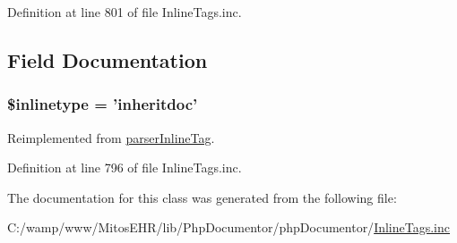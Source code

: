\-Definition at line 801 of file \-Inline\-Tags.\-inc.


\begin{DoxyCode}
    {
    }
\end{DoxyCode}


\subsection{\-Field \-Documentation}
\hypertarget{classparser_inheritdoc_inline_tag_a7583c1b3912b7afa3f038eb353a6ad97}{
\subsubsection[{\$inlinetype}]{\setlength{\rightskip}{0pt plus 5cm}\$inlinetype = 'inheritdoc'}}\label{classparser_inheritdoc_inline_tag_a7583c1b3912b7afa3f038eb353a6ad97}


\-Reimplemented from \hyperlink{classparser_inline_tag_a7583c1b3912b7afa3f038eb353a6ad97}{parser\-Inline\-Tag}.



\-Definition at line 796 of file \-Inline\-Tags.\-inc.



\-The documentation for this class was generated from the following file\-:\begin{DoxyCompactItemize}
\item 
\-C\-:/wamp/www/\-Mitos\-E\-H\-R/lib/\-Php\-Documentor/php\-Documentor/\hyperlink{_inline_tags_8inc}{\-Inline\-Tags.\-inc}\end{DoxyCompactItemize}
